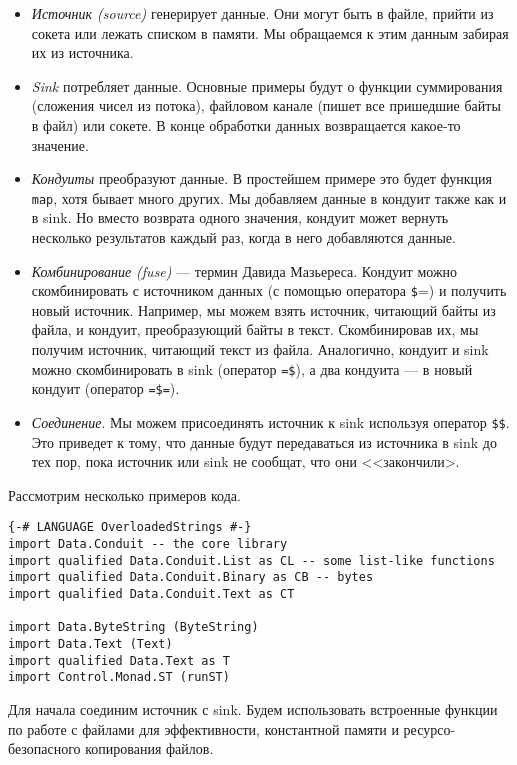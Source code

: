 \begin{itemize}
 \item \emph{Источник (source)} генерирует данные. Они могут быть в файле, прийти из
сокета или лежать списком в памяти. Мы обращаемся к этим данным забирая их из источника.
 \item \emph{Sink} потребляет данные. Основные примеры будут о функции суммирования
(сложения чисел из потока), файловом канале (пишет все пришедшие байты в файл) или
сокете. В конце обработки данных возвращается какое-то значение.
 \item \emph{Кондуиты} преобразуют данные. В простейшем примере это будет функция
\lstinline=map=,
хотя бывает много других. Мы добавляем данные в кондуит также как и в sink. Но вместо
возврата одного значения, кондуит может вернуть несколько результатов каждый раз, когда в
него добавляются данные.
  \item \emph{Комбинирование (fuse)} --- термин Давида Мазьереса. Кондуит можно 
скомбинировать с источником данных (с помощью оператора \lstinline=$==) и получить
новый источник. Например, мы можем взять источник, читающий байты из файла, и
кондуит, преобразующий байты в текст. Скомбинировав их, мы получим 
источник, читающий текст из файла. Аналогично, кондуит и sink можно скомбинировать в sink
(оператор \verb#=$#), а два кондуита --- в новый кондуит (оператор \verb#=$=#).
  \item \emph{Соединение}. Мы можем присоединять источник к sink используя оператор
\verb=$$=.
Это приведет к тому, что данные будут передаваться из источника в sink до тех пор, пока
источник или sink не сообщат, что они <<закончили>.
\end{itemize}

Рассмотрим несколько примеров кода.
\begin{lstlisting}
{-# LANGUAGE OverloadedStrings #-}
import Data.Conduit -- the core library
import qualified Data.Conduit.List as CL -- some list-like functions
import qualified Data.Conduit.Binary as CB -- bytes
import qualified Data.Conduit.Text as CT

import Data.ByteString (ByteString)
import Data.Text (Text)
import qualified Data.Text as T
import Control.Monad.ST (runST)
\end{lstlisting}
Для начала соединим источник с sink. Будем использовать встроенные 
функции по работе с файлами для эффективности, константной памяти и ресурсо-безопасного
копирования файлов.

